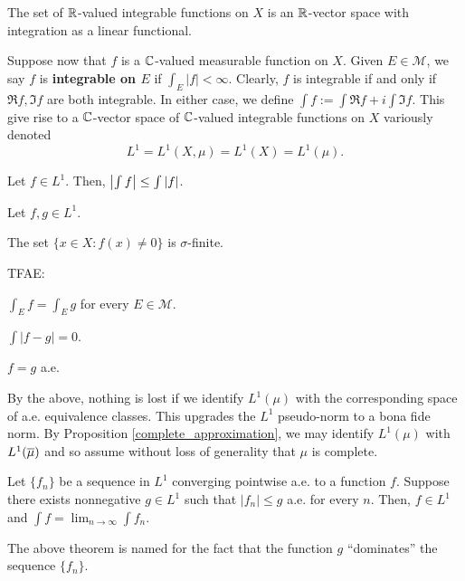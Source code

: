 \documentclass[11pt]{article}
\newcommand{\M}{\mathcal{M}}
\newcommand{\llim}{\displaystyle\lim}
\begin{document}
\begin{proposition}
The set of $\mathbb{R}$-valued integrable functions on $X$ is an $\mathbb{R}$-vector space with integration as a linear functional.
\end{proposition}

Suppose now that $f$ is a $\mathbb{C}$-valued measurable function on $X$. Given $E\in\M$, we say $f$ is \textbf{integrable on $E$} if $\int_E|f|<\infty$. Clearly, $f$ is integrable if and only if $\Re f,\Im f$ are both integrable. In either case, we define $\int f:=\int\Re f+i\int\Im f$. This give rise to a $\mathbb{C}$-vector space of $\mathbb{C}$-valued integrable functions on $X$ variously denoted 
$$L^1=L^1(X,\mu)=L^1(X)=L^1(\mu).$$

\begin{proposition}
Let $f\in L^1$. Then, $\left\lvert\int f\right\rvert\leq\int|f|$.
\end{proposition}

\begin{proposition}
Let $f,g\in L^1$.
\begin{enum}{\alph}
\item The set $\{x\in X : f(x)\neq0\}$ is $\sigma$-finite.
\item TFAE:
\begin{enum}{\roman}
\item $\int_Ef=\int_Eg$ for every $E\in\M$.
\item $\int|f-g|=0$.
\item $f=g$ a.e.
\end{enum}
\end{enum}
\end{proposition}

By the above, nothing is lost if we identify $L^1(\mu)$ with the corresponding space of a.e. equivalence classes. This upgrades the $L^1$ pseudo-norm to a bona fide norm. By Proposition \ref{complete_approximation}, we may identify $L^1(\mu)$ with $L^1(\overline{\mu})$ and so assume without loss of generality that $\mu$ is complete.

\begin{theorem}
Let $\{f_n\}$ be a sequence in $L^1$ converging pointwise a.e. to a function $f$. Suppose there exists nonnegative $g\in L^1$ such that $|f_n|\leq g$ a.e. for every $n$. Then, $f\in L^1$ and $\int f=\llim_{n\to\infty}\int f_n$.
\end{theorem}

The above theorem is named for the fact that the function $g$ ``dominates'' the sequence $\{f_n\}$.
\end{document}
